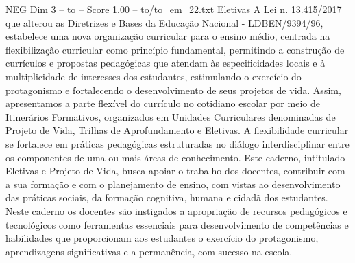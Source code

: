 \begin{textsample}{NEG Dim 3 – to – Score 1.00 – to/to\_em\_22.txt}  \label{ex:f3_neg_182}
Eletivas A Lei n. 13.415/2017 que alterou as Diretrizes e Bases da Educação Nacional - LDBEN/9394/96, estabelece uma nova organização curricular para o ensino médio, centrada na flexibilização curricular como princípio fundamental, permitindo a construção de currículos e propostas pedagógicas que atendam às especificidades locais e à multiplicidade de interesses dos estudantes, estimulando o exercício do protagonismo e fortalecendo o desenvolvimento de seus projetos de vida.
Assim, apresentamos a parte flexível do currículo no cotidiano escolar por meio de Itinerários Formativos, organizados em Unidades Curriculares denominadas de Projeto de Vida, Trilhas de Aprofundamento e Eletivas.
A flexibilidade curricular se fortalece em práticas pedagógicas estruturadas no diálogo interdisciplinar entre os componentes de uma ou mais áreas de conhecimento.
Este caderno, intitulado Eletivas e Projeto de Vida, busca apoiar o trabalho dos docentes, contribuir com a sua formação e com o planejamento de ensino, com vistas ao desenvolvimento das práticas sociais, da formação cognitiva, humana e cidadã dos estudantes.
Neste caderno os docentes são instigados a apropriação de recursos pedagógicos e tecnológicos como ferramentas essenciais para desenvolvimento de competências e habilidades que proporcionam aos estudantes o exercício do protagonismo, aprendizagens significativas e a permanência, com sucesso na escola.

\end{textsample}
